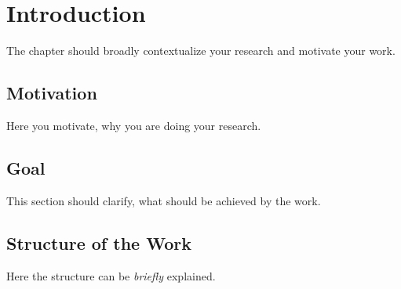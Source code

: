 \chapter{Introduction}

\label{sec:introduction}
The chapter should broadly contextualize your research and motivate your work.

\section{Motivation}
Here you motivate, why you are doing your research.

\section{Goal}
This section should clarify, what should be achieved by the work.

\section{Structure of the Work}
Here the structure can be \emph{briefly} explained.


